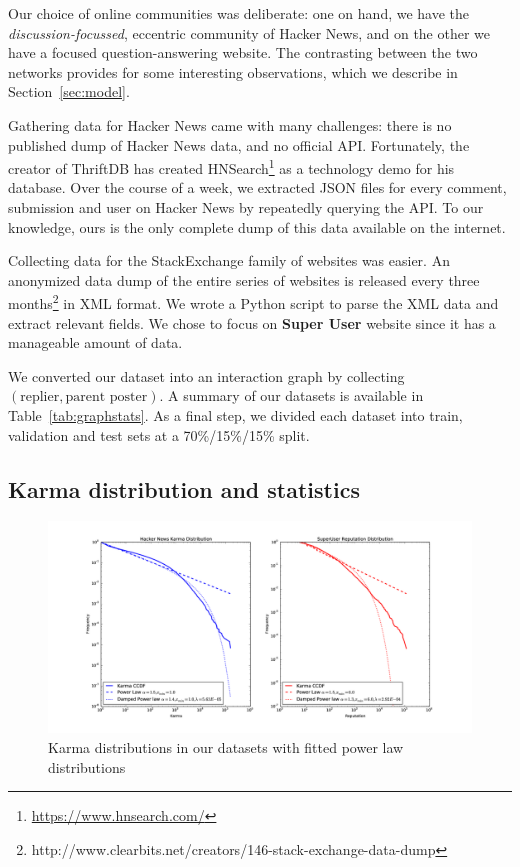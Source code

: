 \documentclass[11pt]{article}
\begin{document}
Our choice of online communities was deliberate: one on hand, we have the
\emph{discussion-focussed}, eccentric community of Hacker News, and on
the other we have a focused question-answering website. The
contrasting between the two networks provides for some interesting
observations, which we describe in Section~\ref{sec:model}.

Gathering data for Hacker News came with many challenges: there is no published
dump of Hacker News data, and no official API. Fortunately, the creator of
ThriftDB has created HNSearch\footnote{\url{https://www.hnsearch.com/}} as a
technology demo for his database. Over the course of a week, we
extracted JSON files for every comment, submission and user on Hacker News by
repeatedly querying the API\@. To our knowledge, ours is the only complete dump
of this data available on the internet.

Collecting data for the StackExchange family of websites was easier.
An anonymized data dump of the entire series of websites is released every three
months\footnote{http://www.clearbits.net/creators/146-stack-exchange-data-dump}
in XML format. We wrote a Python script to parse the XML data and extract
relevant fields. We chose to focus on \textbf{Super User} website since it
has a manageable amount of data.

We converted our dataset into an interaction graph by 
collecting $(\text{replier}, \text{parent poster})$. A summary of our datasets is
available in Table~\ref{tab:graphstats}. As a final step, we divided each
dataset into train, validation and test sets at a 70\%/15\%/15\% split.

\subsection{Karma distribution and statistics}

\begin{figure}[t]
\centering
\includegraphics[width=0.95\linewidth]{powerlaws-png}
\caption{Karma distributions in our datasets with fitted power law distributions}
\label{fig:powerlaws}
\end{figure}
\end{document}
